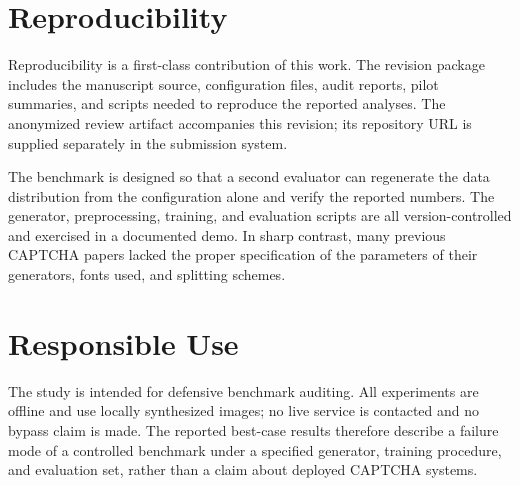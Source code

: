 \documentclass[pdflatex,sn-mathphys-num,iicol]{sn-jnl}
\begin{document}
\section{Reproducibility}

Reproducibility is a first-class contribution of this work. The revision package includes the manuscript source, configuration files, audit reports, pilot summaries, and scripts needed to reproduce the reported analyses. The anonymized review artifact accompanies this revision; its repository URL is supplied separately in the submission system.

The benchmark is designed so that a second evaluator can regenerate the data distribution from the configuration alone and verify the reported numbers. The generator, preprocessing, training, and evaluation scripts are all version-controlled and exercised in a documented demo. In sharp contrast, many previous CAPTCHA papers lacked the proper specification of the parameters of their generators, fonts used, and splitting schemes.
\section{Responsible Use}
The study is intended for defensive benchmark auditing. All experiments are
offline and use locally synthesized images; no live service is contacted and no
bypass claim is made. The reported best-case results therefore describe a failure
mode of a controlled benchmark under a specified generator, training procedure,
and evaluation set, rather than a claim about deployed CAPTCHA systems.

\end{document}
